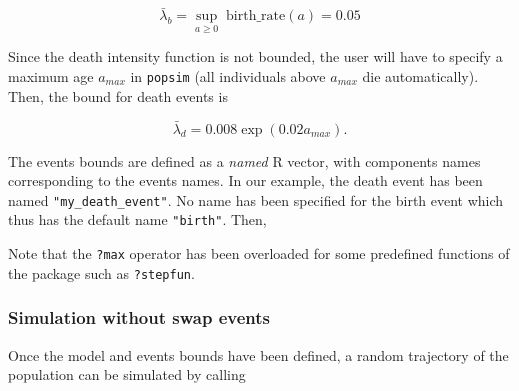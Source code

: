 \[\bar\lambda_b = \sup_{a\geq 0} \;  \text{birth\_rate}(a) = 0.05\]

Since the death intensity function is not bounded, the user will have to specify a maximum age \(a_{max}\) in \texttt{popsim} (all individuals above \(a_{max}\) die automatically). Then, the bound for death events is

\[ \bar \lambda_d = 0.008\exp(0.02 a_{max}).\]

The events bounds are defined as a \emph{named} R vector, with components names corresponding to the events names. In our example, the death event has been named \texttt{"my\_death\_event"}. No name has been specified for the birth event which thus has the default name \texttt{"birth"}. Then,

\begin{Shaded}
\begin{Highlighting}[]
\OtherTok{\textless{}{-}}  
\OtherTok{\textless{}{-}} \NormalTok{(} \OtherTok{=} \SpecialCharTok{*}\NormalTok{(}\SpecialCharTok{*}
                   \OtherTok{=} \SpecialCharTok{$}

\end{Highlighting}
\end{Shaded}

Note that the \texttt{?max} operator has been overloaded for some predefined functions of the package such as \texttt{?stepfun}.

\hypertarget{Simulation1}{%
\subsubsection{Simulation without swap events}\label{Simulation1}}

Once the model and events bounds have been defined, a random trajectory of the population can be simulated by calling

\begin{Shaded}
\begin{Highlighting}[]
\OtherTok{\textless{}{-}} 
                   \NormalTok{)}
\end{Highlighting}
\end{Shaded}

